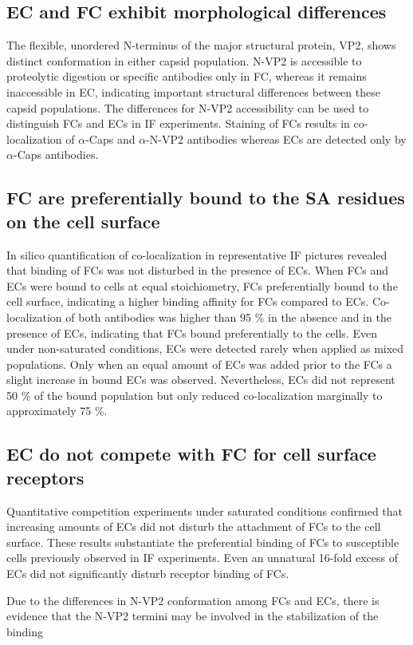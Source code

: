 \subsection{EC and FC exhibit morphological differences}
The flexible, unordered N-terminus of the major structural protein, VP2, shows distinct conformation in either capsid population. N-VP2 is accessible to proteolytic digestion or specific antibodies only in FC, whereas it remains inaccessible in EC, indicating important structural differences between these capsid populations. The differences for N-VP2 accessibility can be used to distinguish FCs and ECs in IF experiments. Staining of FCs results in co-localization of $\alpha$-Caps and $\alpha$-N-VP2 antibodies whereas ECs are detected only by $\alpha$-Caps antibodies.   

    


\subsection{FC are preferentially bound to the SA residues on the cell surface}
In silico quantification of co-localization in representative IF pictures revealed that binding of FCs was not disturbed in the presence of ECs. When FCs and ECs were bound to cells at equal stoichiometry, FCs preferentially bound to the cell surface, indicating a higher binding affinity for FCs compared to ECs. Co-localization of both antibodies was higher than 95 \% in the absence and in the presence of ECs, indicating that FCs bound preferentially to the cells. Even under non-saturated conditions, ECs were detected rarely when applied as mixed populations. Only when an equal amount of ECs was added prior to the FCs a slight increase in bound ECs was observed. Nevertheless, ECs did not represent 50 \% of the bound population but only reduced co-localization marginally to approximately 75 \%.           

\subsection{EC do not compete with FC for cell surface receptors}
Quantitative competition experiments under saturated conditions confirmed that increasing amounts of ECs did not disturb the attachment of FCs to the cell surface. These results substantiate the preferential binding of FCs to susceptible cells previously observed in IF experiments. Even an unnatural 16-fold excess of ECs did not significantly disturb receptor binding of FCs. 


Due to the differences in N-VP2 conformation among FCs and ECs, there is evidence that the N-VP2 termini may be involved in the stabilization of the binding   

